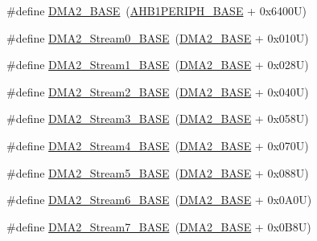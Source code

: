 \begin{DoxyCompactItemize}
\item 
\#define \hyperlink{group___peripheral__memory__map_gab72a9ae145053ee13d1d491fb5c1df64}{D\+M\+A2\+\_\+\+B\+A\+SE}~(\hyperlink{group___peripheral__memory__map_ga811a9a4ca17f0a50354a9169541d56c4}{A\+H\+B1\+P\+E\+R\+I\+P\+H\+\_\+\+B\+A\+SE} + 0x6400\+U)
\item 
\#define \hyperlink{group___peripheral__memory__map_gac4c67b24726ba6b94d03adb351bcec4d}{D\+M\+A2\+\_\+\+Stream0\+\_\+\+B\+A\+SE}~(\hyperlink{group___peripheral__memory__map_gab72a9ae145053ee13d1d491fb5c1df64}{D\+M\+A2\+\_\+\+B\+A\+SE} + 0x010\+U)
\item 
\#define \hyperlink{group___peripheral__memory__map_ga35512bdc3f5e9df4557c2fbe7935d0b1}{D\+M\+A2\+\_\+\+Stream1\+\_\+\+B\+A\+SE}~(\hyperlink{group___peripheral__memory__map_gab72a9ae145053ee13d1d491fb5c1df64}{D\+M\+A2\+\_\+\+B\+A\+SE} + 0x028\+U)
\item 
\#define \hyperlink{group___peripheral__memory__map_gaed33a06f08188466f2ede06160984e9a}{D\+M\+A2\+\_\+\+Stream2\+\_\+\+B\+A\+SE}~(\hyperlink{group___peripheral__memory__map_gab72a9ae145053ee13d1d491fb5c1df64}{D\+M\+A2\+\_\+\+B\+A\+SE} + 0x040\+U)
\item 
\#define \hyperlink{group___peripheral__memory__map_gaf3a9480e08c6ae94f4482e0cdaebdd17}{D\+M\+A2\+\_\+\+Stream3\+\_\+\+B\+A\+SE}~(\hyperlink{group___peripheral__memory__map_gab72a9ae145053ee13d1d491fb5c1df64}{D\+M\+A2\+\_\+\+B\+A\+SE} + 0x058\+U)
\item 
\#define \hyperlink{group___peripheral__memory__map_gad1e67740e6301233473f64638145dd1f}{D\+M\+A2\+\_\+\+Stream4\+\_\+\+B\+A\+SE}~(\hyperlink{group___peripheral__memory__map_gab72a9ae145053ee13d1d491fb5c1df64}{D\+M\+A2\+\_\+\+B\+A\+SE} + 0x070\+U)
\item 
\#define \hyperlink{group___peripheral__memory__map_gaed1460fdc407b6decfbffccb0260d0af}{D\+M\+A2\+\_\+\+Stream5\+\_\+\+B\+A\+SE}~(\hyperlink{group___peripheral__memory__map_gab72a9ae145053ee13d1d491fb5c1df64}{D\+M\+A2\+\_\+\+B\+A\+SE} + 0x088\+U)
\item 
\#define \hyperlink{group___peripheral__memory__map_ga5e81174c96fd204fa7c82c815e85c8e6}{D\+M\+A2\+\_\+\+Stream6\+\_\+\+B\+A\+SE}~(\hyperlink{group___peripheral__memory__map_gab72a9ae145053ee13d1d491fb5c1df64}{D\+M\+A2\+\_\+\+B\+A\+SE} + 0x0\+A0\+U)
\item 
\#define \hyperlink{group___peripheral__memory__map_gaa9faa708ad2440d24eb1064cba9bb06d}{D\+M\+A2\+\_\+\+Stream7\+\_\+\+B\+A\+SE}~(\hyperlink{group___peripheral__memory__map_gab72a9ae145053ee13d1d491fb5c1df64}{D\+M\+A2\+\_\+\+B\+A\+SE} + 0x0\+B8\+U)

\end{DoxyCompactItemize}
